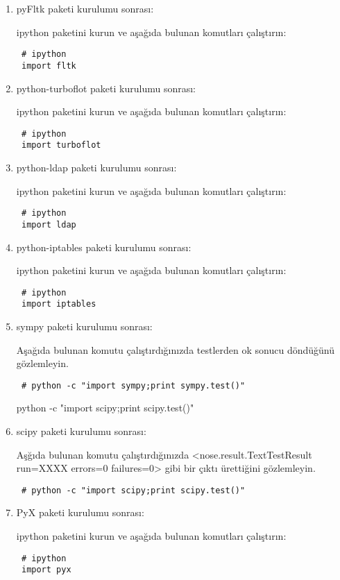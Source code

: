 \documentclass[a4paper,10pt]{article}
\begin{document}
\begin{enumerate}
\item pyFltk paketi kurulumu sonrası:

ipython paketini kurun ve aşağıda bulunan komutları çalıştırın:
\begin{verbatim}
 # ipython
 import fltk
\end{verbatim}


\item python-turboflot paketi kurulumu sonrası:

ipython paketini kurun ve aşağıda bulunan komutları çalıştırın:
\begin{verbatim}
 # ipython
 import turboflot
\end{verbatim}

\item python-ldap paketi kurulumu sonrası:

ipython paketini kurun ve aşağıda bulunan komutları çalıştırın:
\begin{verbatim}
 # ipython
 import ldap
\end{verbatim}

\item python-iptables paketi kurulumu sonrası:

ipython paketini kurun ve aşağıda bulunan komutları çalıştırın:
\begin{verbatim}
 # ipython
 import iptables
\end{verbatim}

\item sympy paketi kurulumu sonrası:

Aşağıda bulunan komutu çalıştırdığınızda testlerden ok sonucu döndüğünü gözlemleyin.
\begin{verbatim}
 # python -c "import sympy;print sympy.test()"
\end{verbatim}

python -c "import scipy;print scipy.test()"

\item scipy paketi kurulumu sonrası:

Aşğıda bulunan komutu çalıştırdığınızda <nose.result.TextTestResult run=XXXX errors=0 failures=0> gibi bir çıktı ürettiğini gözlemleyin.
\begin{verbatim}
 # python -c "import scipy;print scipy.test()"
\end{verbatim}

\item PyX paketi kurulumu sonrası:

ipython paketini kurun ve aşağıda bulunan komutları çalıştırın:
\begin{verbatim}
 # ipython
 import pyx
\end{verbatim}


\end{enumerate}
\end{document}
